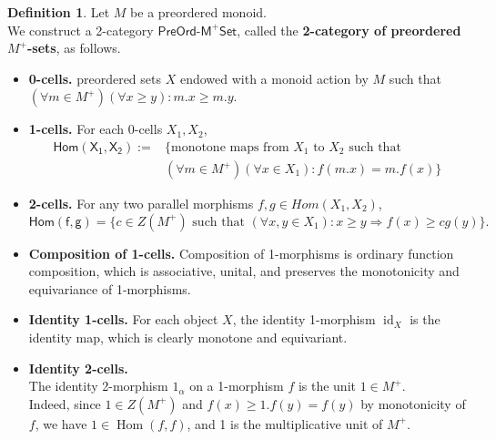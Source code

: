 \documentclass[a4paper,10pt]{article}
\theoremstyle{plain}
\theoremstyle{definition}
\newtheorem{definition}[theorem]{Definition}
\theoremstyle{remark}
\begin{document}
\begin{definition}
  Let $M$ be a preordered monoid. \\
  We construct a 2-category $\mathsf{PreOrd\text{-}M^+Set}$, called the \textbf{2-category of preordered $M^+$-sets}, as follows.

  \begin{itemize}
    \item \textbf{0-cells.} preordered sets $X$ endowed with a monoid action by $M$ such that $(\forall m \in M^+)(\forall x \geq y) : m.x \geq m.y$. 
    \item \textbf{1-cells.} For each 0-cells $X_1, X_2$, 
    \begin{align*} \mathsf{Hom( X_1, X_2)} := &\{ \text{monotone maps  from } X_1 \text{ to } X_2 \text{ such that } \\
                               & (\forall m \in M^+)(\forall x \in X_1) :  f(m.x) = m.f(x) \}
    \end{align*}
    \item \textbf{2-cells.} For any two parallel morphisms $f,g \in Hom(X_1,X_2)$,
  \[ \mathsf{Hom(f,g)} = \{ c \in Z(M^+) \text{ such that } (\forall x,y \in X_1) : x \geq y \Rightarrow  f(x) \geq c g(y) \}. \]

  \item \textbf{Composition of 1-cells.}
          Composition of 1-morphisms is ordinary function composition, which is associative, unital, and preserves the monotonicity and equivariance of 1-morphisms.
    \item \textbf{Identity 1-cells.}
    For each object \(X\), the identity 1-morphism \(\operatorname{id}_X\) is the identity map, which is clearly monotone and equivariant.
    
    

            \item \textbf{Identity 2-cells.} \\
                  The identity 2-morphism \(1_\alpha\) on a 1-morphism \(f\) is the unit \(1 \in M^+\). \\
                  Indeed, since \(1 \in Z(M^+)\) and \(f(x) \geq 1.f(y) = f(y)\) by monotonicity of \(f\), we have \(1 \in \operatorname{Hom}(f, f)\), and 1 is the multiplicative unit of $M^+$.


\end{itemize}
\end{definition}
\end{document}
